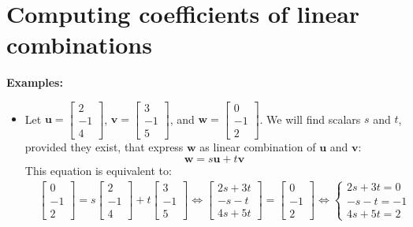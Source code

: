 \documentclass{article}
\begin{document}
\section*{Computing coefficients of linear combinations}

\textbf{Examples:}
\begin{itemize}
\item Let \(\mathbf{u} = \begin{bmatrix} 2 \\ -1 \\ 4 \end{bmatrix}\), \(\mathbf{v} = \begin{bmatrix} 3 \\ -1 \\ 5 \end{bmatrix}\), and \(\mathbf{w} = \begin{bmatrix} 0 \\ -1 \\ 2 \end{bmatrix}\). We will find scalars \(s\) and \(t\), provided they exist, that express \(\mathbf{w}\) as linear combination of \(\mathbf{u}\) and \(\mathbf{v}\):
\[\mathbf{w} = s\mathbf{u} + t\mathbf{v}\]
This equation is equivalent to:
\begin{align*}
& \begin{bmatrix} 0 \\ -1 \\ 2 \end{bmatrix} = s\begin{bmatrix} 2 \\ -1 \\ 4 \end{bmatrix} + t\begin{bmatrix} 3 \\ -1 \\ 5 \end{bmatrix} 
\iff \begin{bmatrix} 2s + 3t \\ -s - t \\ 4s + 5t \end{bmatrix} = \begin{bmatrix} 0 \\ -1 \\ 2 \end{bmatrix} 
\iff \left\{\begin{array}{c} 2s + 3t = 0 \\ -s - t = -1 \\ 4s + 5t = 2 \end{array}\right.

\end{align*}
\end{itemize}
\end{document}
